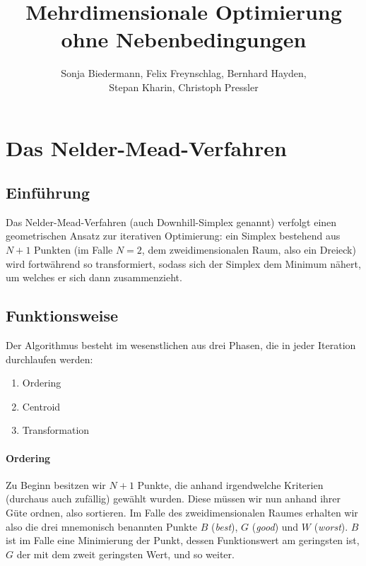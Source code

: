 \documentclass[naustrian]{article}
\begin{document}
\title{Mehrdimensionale Optimierung ohne Nebenbedingungen}

\author{Sonja Biedermann, Felix Freynschlag, Bernhard Hayden,\\
Stepan Kharin, Christoph Pressler}

\maketitle
\tableofcontents
\listoffigures

\section{Das Nelder-Mead-Verfahren}

\subsection{Einführung}

Das Nelder-Mead-Verfahren (auch Downhill-Simplex genannt) verfolgt
einen geometrischen Ansatz zur iterativen Optimierung: ein Simplex
bestehend aus $N+1$ Punkten (im Falle $N=2$, dem zweidimensionalen
Raum, also ein Dreieck) wird fortwährend so transformiert, sodass
sich der Simplex dem Minimum nähert, um welches er sich dann zusammenzieht.\cite{nelder-mead-enwiki}

\subsection{Funktionsweise}

Der Algorithmus besteht im wesenstlichen aus drei
Phasen\cite{nelder-mead-scholarpedia}, die in jeder Iteration durchlaufen
werden:
\begin{enumerate}
    \item Ordering
    \item Centroid
    \item Transformation
\end{enumerate}

\paragraph{Ordering}

Zu Beginn besitzen wir $N+1$ Punkte, die anhand irgendwelche Kriterien
(durchaus auch zufällig) gewählt wurden. Diese müssen wir nun anhand
ihrer Güte ordnen, also sortieren. Im Falle des zweidimensionalen
Raumes erhalten wir also die drei mnemonisch benannten Punkte \textbf{$B$
}(\emph{best}), $G$ (\emph{good}) und $W$ (\emph{worst}).\cite{nelder-mead-unknown} $B$ ist
im Falle eine Minimierung der Punkt, dessen Funktionswert am geringsten
ist, $G$ der mit dem zweit geringsten Wert, und so weiter.
\end{document}
